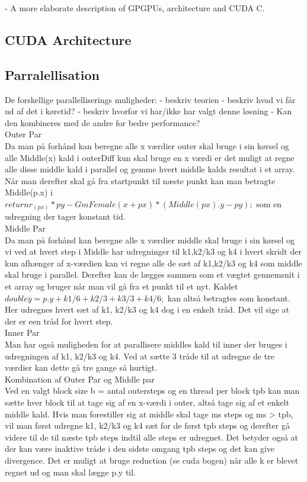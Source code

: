 		- A more elaborate description of GPGPUs, architecture and CUDA C.

\subsection{CUDA Architecture}
		
\subsection{Parralellisation}

De forskellige parallelliserings muligheder:
- beskriv teorien
- beskriv hvad vi får ud af det i køretid?
- beskriv hvorfor vi har/ikke har valgt denne løsning
- Kan den kombineres med de andre for bedre performance?\\

Outer Par \\
Da man på forhånd kan beregne alle x værdier outer skal bruge i sin kørsel og alle Middle(x) kald i outerDiff kun skal bruge en x værdi er det muligt at regne alle disse middle kald i parallel og gemme hvert middle kalds resultat i et array. Når man derefter skal gå fra startpunkt til næste punkt kan man betragte Middle(p.x) i $return r_(px) * py - GmFemale(x + px) * (Middle(px).y - py);$ som en udregning der tager konstant tid.\\

Middle Par\\
Da man på forhånd kan beregne alle x værdier middle skal bruge i sin kørsel og vi ved at hvert step i Middle har udregninger til k1,k2/k3 og k4 i hvert skridt der kun afhænger af x-værdien kan vi regne alle de sæt af k1,k2/k3 og k4 som middle skal bruge i parallel. Derefter kan de lægges sammen som et vægtet gennemsnit i et array og bruger når man vil gå fra et punkt til et nyt. Kaldet $double y = p.y + k1/6 + k2/3 + k3/3 + k4/6;$ kan altså betragtes som konstant. Her udregnes hvert sæt af k1, k2/k3 og k4 dog i en enkelt tråd. Det vil sige at der er een tråd for hvert step.\\

Inner Par\\
Man har også muligheden for at parallisere middles kald til inner der bruges i udregningen af k1, k2/k3 og k4. Ved at sætte 3 tråde til at udregne de tre værdier kan dette gå tre gange så hurtigt.\\

Kombination af Outer Par og Middle par\\
Ved en valgt block size b = antal outersteps og en thread per block tpb kan man sætte hver block til at tage sig af en x-værdi i outer, altså tage sig af et enkelt middle kald. Hvis man forestiller sig at middle skal tage ms steps og ms > tpb, vil man først udregne k1, k2/k3 og k4 sæt for de først tpb steps og derefter gå videre til de til næste tpb steps indtil alle steps er udregnet. Det betyder også at der kan være inaktive tråde i den sidste omgang tpb steps og det kan give divergence. Det er muligt at bruge reduction (se cuda bogen) når alle k er blevet regnet ud og man skal lægge p.y til.\\

